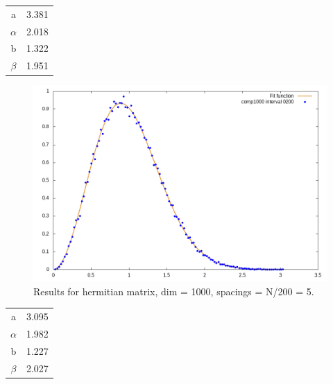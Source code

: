 \documentclass[12pt, a4paper, notitlepage]{report}
\begin{document}
\begin{table}[H]
	\centering
	\begin{tabular}{|c|c|}
		
		\hline
		 
		a			& 3.381	\\
		$\alpha$	& 2.018	\\
		b			& 1.322	\\
		$\beta$		& 1.951	\\
		
		\hline
		
	\end{tabular}
\end{table}

\newpage

\begin{figure}[H]
	\centering
	\includegraphics[scale=0.6]{./Comp_1000/hist_interval_0005_fit.png} 
	\caption{Results for hermitian matrix, dim = 1000, spacings = N/200 = 5.}
	\label{figure_lambdas}
\end{figure}

\begin{table}[H]
	\centering
	\begin{tabular}{|c|c|}
		
		\hline
		   
		a			& 3.095	\\
		$\alpha$	& 1.982	\\
		b			& 1.227	\\
		$\beta$		& 2.027	\\
		
		\hline
		
	\end{tabular}
\end{table}
\end{document}
